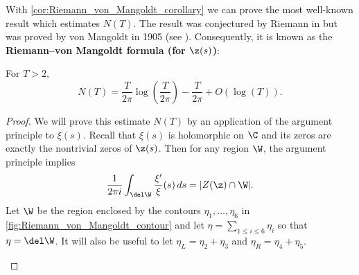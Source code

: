       With \cref{cor:Riemann_von_Mangoldt_corollary} we can prove the most well-known result which estimates $N(T)$. The result was conjectured by Riemann in \cite{riemann1859ueber} but was proved by von Mangoldt in 1905 (see \cite{mangoldt1905verteilung}). Consequently, it is known as the \textbf{Riemann–von Mangoldt formula (for $\z(s)$)}:

      \begin{theorem}
        For $T > 2$,
        \[
          N(T) = \frac{T}{2\pi}\log\left(\frac{T}{2\pi}\right)-\frac{T}{2\pi}+O(\log(T)).
        \]
      \end{theorem}
      \begin{proof}
        We will prove this estimate $N(T)$ by an application of the argument principle to $\xi(s)$. Recall that $\xi(s)$ is holomorphic on $\C$ and its zeros are exactly the nontrivial zeros of $\z(s)$. Then for any region $\W$, the argument principle implies
        \[
          \frac{1}{2\pi i}\int_{\del\W}\frac{\xi'}{\xi}(s)\,ds = |Z(\z) \cap \W|.
        \]
        Let $\W$ be the region enclosed by the contours $\eta_{1},\ldots,\eta_{6}$ in \cref{fig:Riemann_von_Mangoldt_contour} and let $\eta = \sum_{1 \le i \le 6}\eta_{i}$ so that $\eta = \del\W$. It will also be useful to let $\eta_{L} = \eta_{2}+\eta_{3}$ and $\eta_{R} = \eta_{4}+\eta_{5}$.
        
        \begin{figure}[ht]
          \centering
\end{figure}
\end{proof}
